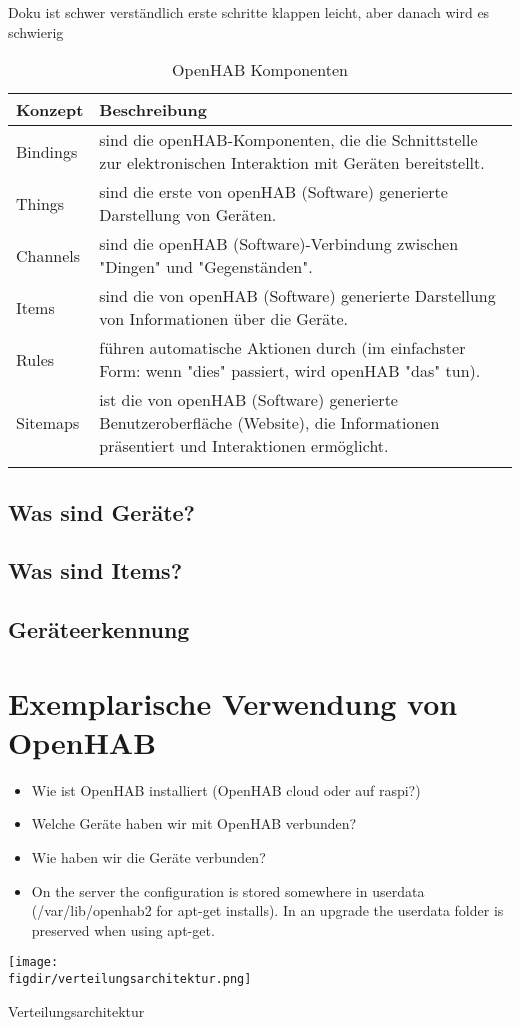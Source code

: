 Doku ist schwer verständlich
erste schritte klappen leicht, aber danach wird es schwierig

\begin{longtable}{| p{2cm} | p{13cm}|}
	\hline
	\textbf{Konzept} & \textbf{Beschreibung} \\
	\hline \hline
	\centering Bindings & sind die openHAB-Komponenten, die die Schnittstelle zur elektronischen Interaktion mit Geräten bereitstellt.  \\
	\hline
	\centering Things & sind die erste von openHAB (Software) generierte Darstellung von Geräten. \\
	\hline
	\centering Channels & sind die openHAB (Software)-Verbindung zwischen "Dingen" und "Gegenständen". \\
	\hline
	\centering Items & sind die von openHAB (Software) generierte Darstellung von Informationen über die Geräte.\\
	\hline
	\centering Rules & führen automatische Aktionen durch (im einfachster Form: wenn "dies" passiert, wird openHAB "das" tun).\\
	\hline
	\centering Sitemaps & ist die von openHAB (Software) generierte Benutzeroberfläche (Website), die Informationen präsentiert und Interaktionen ermöglicht.\\
	\hline
	\caption{OpenHAB Komponenten}
	\label{table:openhub-components}
\end{longtable}

\subsection{Was sind Geräte?}

\subsection{Was sind Items?}

\subsection{Geräteerkennung}

\section{Exemplarische Verwendung von OpenHAB}
\begin{itemize}
	\item Wie ist OpenHAB installiert (OpenHAB cloud oder auf raspi?)
	\item Welche Geräte haben wir mit OpenHAB verbunden?
	\item Wie haben wir die Geräte verbunden?
	\item On the server the configuration is stored somewhere in userdata (/var/lib/openhab2 for apt-get installs).
	In an upgrade the userdata folder is preserved when using apt-get.
\end{itemize}
\begin{minipage}{\textwidth}
	\centering
	\captionsetup{type=figure}
	\texttt{[image: \\figdir/verteilungsarchitektur.png]}
	\caption{Verteilungsarchitektur \label{fig:verteilungs-architektur}}
\end{minipage}


